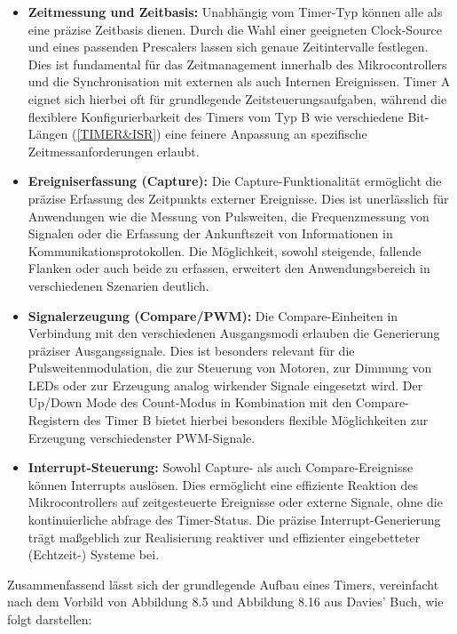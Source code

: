 \begin{itemize}
	\item \textbf{Zeitmessung und Zeitbasis:} Unabh\"angig vom Timer-Typ k\"onnen alle als eine pr\"azise Zeitbasis dienen. Durch die Wahl einer geeigneten Clock-Source und eines passenden Prescalers lassen sich genaue Zeitintervalle festlegen. Dies ist fundamental f\"ur das Zeitmanagement innerhalb des Mikrocontrollers und die Synchronisation mit externen als auch Internen Ereignissen. Timer A eignet sich hierbei oft f\"ur grundlegende Zeitsteuerungsaufgaben, w\"ahrend die flexiblere Konfigurierbarkeit des Timers vom Typ B wie \zB verschiedene Bit-L\"angen (\ref{TIMER&ISR}) eine feinere Anpassung an spezifische Zeitmessanforderungen erlaubt.

	\item \textbf{Ereigniserfassung (Capture):} Die Capture-Funktionalit\"at erm\"oglicht die pr\"azise Erfassung des Zeitpunkts externer Ereignisse. Dies ist unerl\"asslich f\"ur Anwendungen wie die Messung von Pulsweiten, die Frequenzmessung von Signalen oder die Erfassung der Ankunftszeit von Informationen in Kommunikationsprotokollen. Die M\"oglichkeit, sowohl steigende, fallende Flanken oder auch beide zu erfassen, erweitert den Anwendungsbereich in verschiedenen Szenarien deutlich.

	\item \textbf{Signalerzeugung (Compare/PWM):} Die Compare-Einheiten in Verbindung mit den verschiedenen Ausgangsmodi erlauben die Generierung pr\"aziser Ausgangssignale. Dies ist besonders relevant f\"ur die Pulsweitenmodulation, die zur Steuerung von Motoren, zur Dimmung von LEDs oder zur Erzeugung analog wirkender Signale eingesetzt wird. Der Up/Down Mode des Count-Modus in Kombination mit den Compare-Registern des Timer B bietet hierbei besonders flexible M\"oglichkeiten zur Erzeugung verschiedenster PWM-Signale.

	\item \textbf{Interrupt-Steuerung:} Sowohl Capture- als auch Compare-Ereignisse k\"onnen Interrupts ausl\"osen. Dies erm\"oglicht eine effiziente Reaktion des Mikrocontrollers auf zeitgesteuerte Ereignisse oder externe Signale, ohne die kontinuierliche abfrage des Timer-Status. Die pr\"azise Interrupt-Generierung tr\"agt maßgeblich zur Realisierung reaktiver und effizienter eingebetteter (Echtzeit-) Systeme bei.
\end{itemize}

Zusammenfassend l\"asst sich der grundlegende Aufbau eines Timers, vereinfacht nach dem Vorbild von Abbildung 8.5 und Abbildung 8.16 aus Davies' Buch, wie folgt darstellen:

